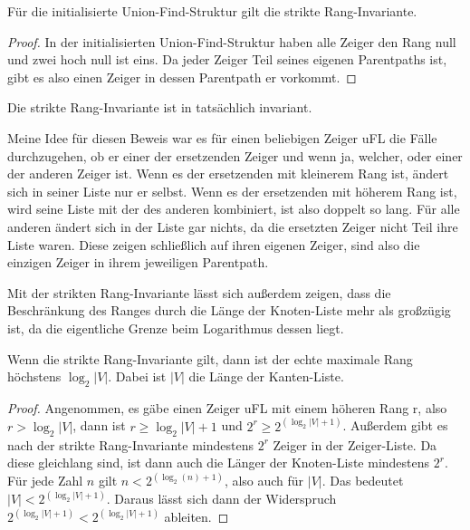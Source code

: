 \begin{lemma}[\KruskalinitunionFindrankInvariantstrict]\label{KruskalinitunionFindrankInvariantstrict}
  Für die initialisierte Union-Find-Struktur gilt die strikte Rang-Invariante.
\end{lemma}
\begin{proof}
  In der initialisierten Union-Find-Struktur haben alle Zeiger den Rang null und zwei hoch null ist eins.
  Da jeder Zeiger Teil seines eigenen Parentpaths ist, gibt es also einen Zeiger in dessen Parentpath er vorkommt.
\end{proof}



\begin{lemma}[\KruskalupdateunionFindrankInvariantstrict]\label{KruskalupdateunionFindrankInvariantstrict}
  Die strikte Rang-Invariante ist in \KruskalupdateunionFind tatsächlich invariant.
\end{lemma}
Meine Idee für diesen Beweis war es für einen beliebigen Zeiger uFL die Fälle durchzugehen, ob er einer der ersetzenden Zeiger und wenn ja, welcher, oder einer der anderen Zeiger ist.
Wenn es der ersetzenden mit kleinerem Rang ist, ändert sich in seiner Liste nur er selbst.
Wenn es der ersetzenden mit höherem Rang ist, wird seine Liste mit der des anderen kombiniert, ist also doppelt so lang.
Für alle anderen ändert sich in der Liste gar nichts, da die ersetzten Zeiger nicht Teil ihre Liste waren.
Diese zeigen schließlich auf ihren eigenen Zeiger, sind also die einzigen Zeiger in ihrem jeweiligen Parentpath.

Mit der strikten Rang-Invariante lässt sich außerdem zeigen, dass die Beschränkung des Ranges durch die Länge der Knoten-Liste mehr als großzügig ist,
da die eigentliche Grenze beim Logarithmus dessen liegt.

\begin{lemma}[\Kruskalmaxrank]\label{Kruskalmaxrank}
  Wenn die strikte Rang-Invariante gilt, dann ist der echte maximale Rang höchstens $\log_2|V|$.
  Dabei ist $|V|$ die Länge der Kanten-Liste.
\end{lemma}
\begin{proof}
  Angenommen, es gäbe einen Zeiger uFL mit einem höheren Rang r, also $r > \log_2|V|$, dann ist $r \ge \log_2|V| + 1$ und $2^r \ge 2^(\log_2|V| + 1)$.
  Außerdem gibt es nach der strikte Rang-Invariante mindestens $2^r$ Zeiger in der Zeiger-Liste.
  Da diese gleichlang sind, ist dann auch die Länger der Knoten-Liste mindestens $2^r$.
  Für jede Zahl $n$ gilt $n < 2^(\log_2(n) + 1)$, also auch für $|V|$.
  Das bedeutet $|V| < 2^(\log_2|V| + 1)$.
  Daraus lässt sich dann der Widerspruch $2^(\log_2|V| + 1) < 2^(\log_2|V| + 1)$ ableiten.
\end{proof}
